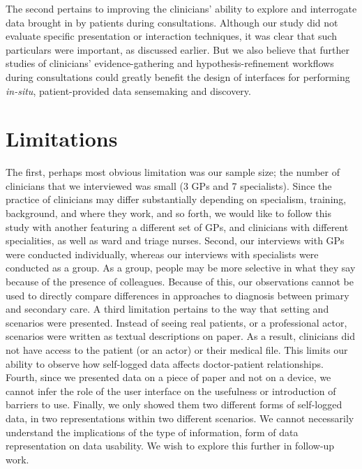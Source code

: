 \documentclass{sigchi}
\begin{document}
The second pertains to improving the clinicians' ability to explore and interrogate data brought in by patients during consultations. Although our study did not evaluate specific presentation or interaction techniques, it was clear that such particulars were important, as discussed earlier. But we also believe that further studies of clinicians' evidence-gathering and hypothesis-refinement workflows during consultations could greatly benefit the design of interfaces for performing \emph{in-situ}, patient-provided data sensemaking and discovery. %


\section{Limitations}

The first, perhaps most obvious limitation was our sample size; the number of clinicians that we interviewed was small (3 GPs and 7 specialists).  Since the practice of clinicians may differ substantially depending on specialism, training, background, and where they work, and so forth, we would like to follow this study with another featuring a different set of GPs, and clinicians with different specialities, as well as ward and triage nurses. Second, our interviews with GPs were conducted individually, whereas our interviews with specialists were conducted as a group. As a group, people may be more selective in what they say because of the presence of colleagues. Because of this, our observations cannot be used to directly compare differences in approaches to diagnosis between primary and secondary care.  A third limitation pertains to the way that setting and scenarios were presented. Instead of seeing real patients, or a professional actor, scenarios were written as textual descriptions on paper.  As a result, clinicians did not have access to the patient (or an actor) or their medical file. This limits our ability to observe how self-logged data affects doctor-patient relationships. Fourth, since we presented data on a piece of paper and not on a device, we cannot infer the role of the user interface on the usefulness or introduction of barriers to use. Finally, we only showed them two different forms of self-logged data, in two representations within two different scenarios. We cannot necessarily understand the implications of the type of information, form of data representation on data usability. We wish to explore this further in follow-up work.
\end{document}
